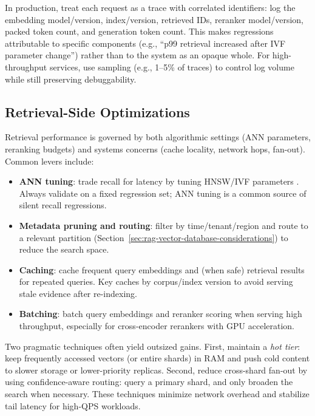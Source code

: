 In production, treat each request as a trace with correlated identifiers: log the embedding model/version, index/version, retrieved IDs, reranker model/version, packed token count, and generation token count. This makes regressions attributable to specific components (e.g., ``p99 retrieval increased after IVF parameter change'') rather than to the system as an opaque whole. For high-throughput services, use sampling (e.g., 1--5\% of traces) to control log volume while still preserving debuggability.

\subsection{Retrieval-Side Optimizations}
Retrieval performance is governed by both algorithmic settings (ANN parameters, reranking budgets) and systems concerns (cache locality, network hops, fan-out). Common levers include:
\begin{itemize}
    \item \textbf{ANN tuning}: trade recall for latency by tuning HNSW/IVF parameters \cite{Malkov2018HNSW,Johnson2019FAISS}. Always validate on a fixed regression set; ANN tuning is a common source of silent recall regressions.
    \item \textbf{Metadata pruning and routing}: filter by time/tenant/region and route to a relevant partition (Section~\ref{sec:rag-vector-database-considerations}) to reduce the search space.
    \item \textbf{Caching}: cache frequent query embeddings and (when safe) retrieval results for repeated queries. Key caches by corpus/index version to avoid serving stale evidence after re-indexing.
    \item \textbf{Batching}: batch query embeddings and reranker scoring when serving high throughput, especially for cross-encoder rerankers with GPU acceleration.
\end{itemize}

Two pragmatic techniques often yield outsized gains. First, maintain a \emph{hot tier}: keep frequently accessed vectors (or entire shards) in RAM and push cold content to slower storage or lower-priority replicas. Second, reduce cross-shard fan-out by using confidence-aware routing: query a primary shard, and only broaden the search when necessary. These techniques minimize network overhead and stabilize tail latency for high-QPS workloads.

